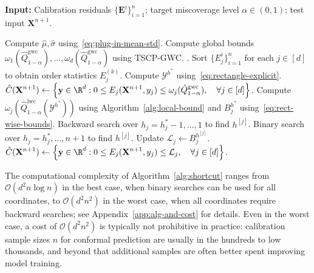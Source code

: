 \begin{algorithm}[!htbp]
\caption{Transductively Standardized Conformal Prediction (TSCP)}
\label{alg:shortcut}
\textbf{Input:} Calibration residuals $\{\mathbf{E}^i\}_{i=1}^{n}$; target miscoverage level $\alpha\in(0,1)$; test input $\mathbf{X}^{n+1}$.
\begin{algorithmic}[1]
\State Compute $\hat{\mu}, \hat{\sigma}$ using~\eqref{eq:plug-in-mean-std}.
\State Compute global bounds $\omega_1(\hat{Q}^{\mathrm{gwc}}_{1-\alpha}),\ldots,\omega_d(\hat{Q}^{\mathrm{gwc}}_{1-\alpha})$ using TSCP-GWC. .
\State Sort $\{{E}^i_j\}_{i=1}^n$ for each $j\in[d]$ to obtain order statistics $E^{(k)}_j$. 
\State Compute $\mathcal{Y}^{h^*}$ using~\eqref{eq:rectangle-explicit}.
    \State \Return $\displaystyle \hat{C}(\mathbf{X}^{n+1}) 
    \gets \left\{\mathbf y \in \R^d: 0\leq E_j(\mathbf{X}^{n+1},y_j) \leq \omega_j(\hat{Q}^{\mathrm{gwc}}_{1-\alpha}), \quad\forall j \in [d]\right\}$.
\Else
        \State Compute $\omega_j(\hat{Q}^{\mathrm{lwc}}_{1-\alpha}(\mathcal{Y}^{h^*}))$ using Algorithm~\ref{alg:local-bound} and $B^{h^*}_j$ using~\eqref{eq:rect-wise-bounds}.
            \State Backward search over $h_j = h^*_j-1,\ldots, 1$ to find $h^{[j]}$.\hfill
        \Else 
            \State Binary search over $h_j = h^*_j,\ldots, n{+}1$ to find $h^{[j]}$.\hfill
        \EndIf
        \State Update $\mathcal{L}_j \gets B^{h^{[j]}}_j$.
    \EndFor
    \State \Return $\displaystyle \hat{C}(\mathbf{X}^{n+1}) 
    \gets \left\{\mathbf y \in \R^d: 0\leq E_j(\mathbf{X}^{n+1},y_j) \leq \mathcal{L}_j, \quad\forall j \in [d]\right\}$.
\EndIf
\end{algorithmic}
\end{algorithm}

The computational complexity of Algorithm~\ref{alg:shortcut} ranges from $\mathcal{O}(d^2 n \log n)$ in the best case, when binary searches can be used for all coordinates, to $\mathcal{O}(d^2 n^2)$ in the worst case, when all coordinates require backward searches; see Appendix~\ref{app:alg-and-cost} for details. Even in the worst case, a cost of $\mathcal{O}(d^2 n^2)$ is typically not prohibitive in practice: calibration sample sizes $n$ for conformal prediction are usually in the hundreds to low thousands, and beyond that additional samples are often better spent improving model training.

